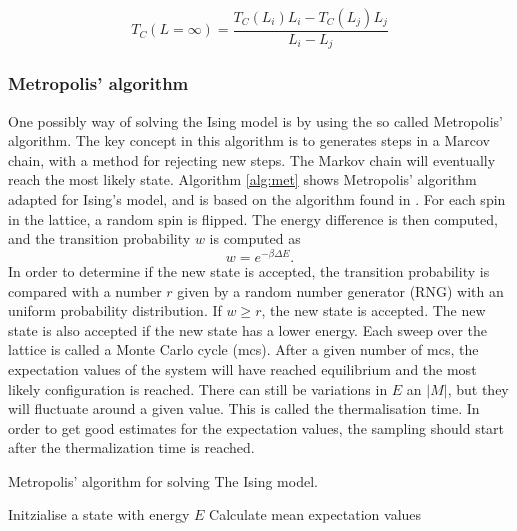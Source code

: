 \begin{equation}\label{eq:Tc}
T_C(L=\infty) = \frac{T_C(L_i)L_i-T_C(L_j)L_j}{L_i-L_j}
\end{equation}

\subsubsection{Metropolis' algorithm}
One possibly way of solving the Ising model is by using the so called Metropolis' algorithm. The key concept in this algorithm is to generates steps in a Marcov chain, with a method for rejecting new steps. The Markov chain will eventually reach the most likely state. Algorithm \ref{alg:met} shows Metropolis' algorithm adapted for Ising's model, and is based on the algorithm found in \cite{lecturenotes}. For each spin in the lattice, a random spin is flipped. The energy difference is then computed, and the transition probability $w$ is computed as
\begin{equation}
w=e^{- \beta \Delta E }.
\end{equation}
In order to determine if the new state is accepted, the transition probability
is compared with a number $r$ given by a random number generator (RNG) with an uniform probability distribution. If $w \geq r$, the new state is accepted. The new state is also accepted if the new state has a lower energy. Each sweep over the lattice is called a Monte Carlo cycle (mcs). After a given number of mcs, the expectation values of the system will have reached equilibrium and the most likely configuration is reached. There can still be variations in $E$ an $|M|$, but they will fluctuate around a given value. This is called the thermalisation time. In order to get good estimates for the expectation values, the sampling should start after the thermalization time is reached. 


\begin{algorithm}[htbp]\label{alg:met}\caption{Metropolis' algorithm for solving The Ising model.}
	\SetAlgoLined
	\BlankLine
	\BlankLine
	Initzialise a state with energy $E$\;
	Calculate mean expectation values\;	
	\BlankLine
	\BlankLine
\end{algorithm}

